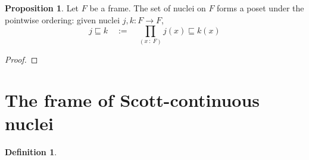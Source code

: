 \documentclass[11pt,a4paper]{article}
\theoremstyle{definition}
\newtheorem{prop}{Proposition}
\newtheorem{defn}{Definition}
\newcommand{\pity}[3]{\prod_{(#1~:~#2)} #3}
\begin{document}
\begin{prop}
  Let $F$ be a frame. The set of nuclei on $F$ forms a poset under the pointwise
  ordering: given nuclei $j, k : F \rightarrow F$,
  \begin{equation*}
    j \sqsubseteq k \quad:=\quad \pity{x}{F}{j(x) \sqsubseteq k(x)}
  \end{equation*}
\end{prop}
\begin{proof}
\end{proof}

\section{The frame of Scott-continuous nuclei}

\begin{defn}
\end{defn}

\printbibliography
\end{document}
